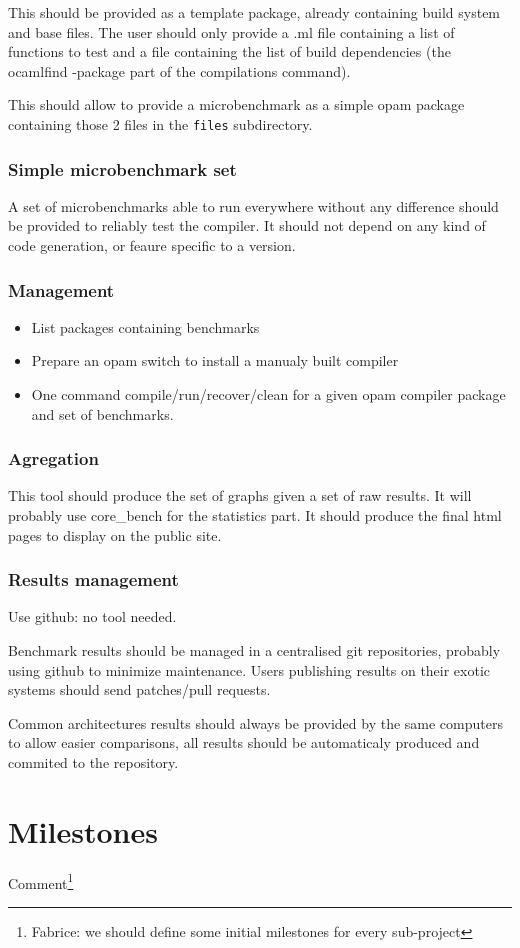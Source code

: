 \documentclass[11pt,a4paper]{article}
\begin{document}
This should be provided as a template package, already containing
build system and base files. The user should only provide a .ml file
containing a list of functions to test and a file containing the list
of build dependencies (the ocamlfind -package part of the compilations
command).

This should allow to provide a microbenchmark as a simple opam package
containing those 2 files in the \texttt{files} subdirectory.

\subsubsection{Simple microbenchmark set}

A set of microbenchmarks able to run everywhere without any difference
should be provided to reliably test the compiler. It should not depend
on any kind of code generation, or feaure specific to a version.

\subsubsection{Management}

\begin{itemize}
\item List packages containing benchmarks
\item Prepare an opam switch to install a manualy built compiler
\item One command compile/run/recover/clean for a given opam compiler
  package and set of benchmarks.
\end{itemize}

\subsubsection{Agregation}

This tool should produce the set of graphs given a set of raw
results. It will probably use core\_bench for the statistics part. It
should produce the final html pages to display on the public site.

\subsubsection{Results management}

Use github: no tool needed.

Benchmark results should be managed in a centralised git repositories,
probably using github to minimize maintenance. Users publishing
results on their exotic systems should send patches/pull requests.

Common architectures results should always be provided by the same
computers to allow easier comparisons, all results should be
automaticaly produced and commited to the repository.

\section{Milestones}

Comment\footnote{Fabrice: we should define some initial milestones for
  every sub-project}
\end{document}
